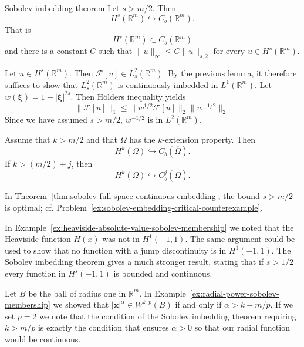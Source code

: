 \begin{Theorem}{Sobolev imbedding theorem}
\label{thm:sobolev-full-space-continuous-embedding}
Let $s>m/2$. Then\[H^s(\mathbb{R}^m)\hookrightarrow C_b(\mathbb{R}^m).\]That is\[H^s(\mathbb{R}^m)\subset C_b(\mathbb{R}^m)\]and there is a constant $C$ such that $\|u\|_{\infty}\leq C\|u\|_{s,2}$ for every $u\in H^s(\mathbb{R}^m)$.
\end{Theorem}

\begin{Proof}
Let $u\in H^s(\mathbb{R}^m)$. Then $\mathcal{F}[u]\in L_s^2(\mathbb{R}^m)$. By the previous lemma, it therefore suffices to show that $L_s^2(\mathbb{R}^m)$ is continuously imbedded in $L^1(\mathbb{R}^m)$. Let $w(\bm{\xi})=1+|\bm{\xi}|^{2s}$. Then Hölder\textquotesingle s inequality yields
\begin{equation}\label{eq:sobolev-embedding-fourier-holder-weight}
\|\mathcal{F}[u]\|_1\leq\|w^{1/2}\mathcal{F}[u]\|_2\|w^{-1/2}\|_2.
\end{equation}
Since we have assumed $s>m/2$, $w^{-1/2}$ is in $L^2(\mathbb{R}^m)$.
\end{Proof}

\begin{Corollary}
\label{cor:sobolev-extension-continuity}
Assume that $k>m/2$ and that $\Omega$ has the $k$-extension property. Then\[H^k(\Omega)\hookrightarrow C_b(\overline\Omega).\]If $k>(m/2)+j$, then\[H^k(\Omega)\hookrightarrow C_b^j(\overline\Omega).\]
\end{Corollary}

\begin{Remark}
\label{rem:sobolev-embedding-optimal-threshold}
In Theorem~\ref{thm:sobolev-full-space-continuous-embedding}, the bound $s>m/2$ is optimal; cf. Problem~\ref{ex:sobolev-embedding-critical-counterexample}.
\end{Remark}

\begin{Example}
\label{ex:sobolev-jump-discontinuity}
In Example~\ref{ex:heaviside-absolute-value-sobolev-membership} we noted that the Heaviside function $H(x)$ was not in $H^1(-1,1)$. The same argument could be used to show that no function with a jump discontinuity is in $H^1(-1,1)$. The Sobolev imbedding theorem gives a much stronger result, stating that if $s>1/2$ every function in $H^s(-1,1)$ is bounded and continuous.
\end{Example}

\begin{Example}
\label{ex:sobolev-radial-power-embedding}
Let $B$ be the ball of radius one in $\mathbb{R}^m$. In Example~\ref{ex:radial-power-sobolev-membership} we showed that $|\bm{x}|^\alpha\in W^{k,p}(B)$ if and only if $\alpha>k-m/p$. If we set $p=2$ we note that the condition of the Sobolev imbedding theorem requiring $k>m/p$ is exactly the condition that ensures $\alpha>0$ so that our radial function would be continuous.
\end{Example}

